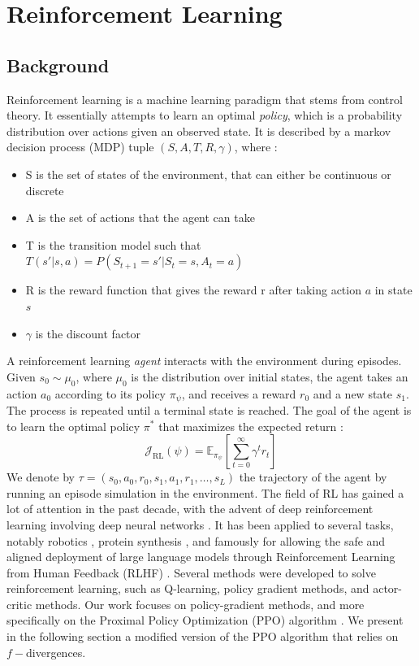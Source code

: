 \section{Reinforcement Learning }\label{sec:rl:sec2}
\subsection{Background}
Reinforcement learning is a machine learning paradigm that stems from control theory. It essentially attempts to learn an optimal \textit{policy}, which is a probability distribution over actions given an observed state.
It is described by a markov decision process (MDP) tuple $(S, A, T, R, \gamma )$, where :
\begin{itemize}
    \item S is the set of states of the environment, that can either be continuous or discrete
    \item A is the set of actions that the agent can take
    \item T is the transition model such that $T(s'| s,a ) = P(S_{t+1} = s' | S_t = s , A_t = a)$
    \item R is the reward function that gives the reward r after taking action $a$ in state $s$
    \item $\gamma$ is the discount factor
\end{itemize}
A reinforcement learning \textit{agent} interacts with the environment during episodes. Given $s_{0} \sim \mu_{0}$, where $\mu_{0}$ is the distribution over initial states, the agent takes an action $a_{0}$ according to its policy $\pi_{\psi}$, and receives a reward $r_{0}$ and a new state $s_{1}$. The process is repeated until a terminal state is reached. The goal of the agent is to learn the optimal policy $\pi^{*}$ that maximizes the expected return :
\begin{equation}
    \mathcal{J}_{\mathrm{RL}}(\psi) = \mathbb{E}_{\pi_{\psi}}[\sum_{t=0}^{\infty} \gamma^{t}r_{t}]
\end{equation}
We denote by $\tau = (s_{0},a_{0},r_{0},s_{1},a_{1},r_{1},\ldots,s_{L})$ the trajectory of the agent by running an episode simulation in the environment.
The field of RL has gained a lot of attention in the past decade, with the advent of deep reinforcement learning involving deep neural networks \citep{mnih2013playingatarideepreinforcement}. It has been applied to several tasks, notably robotics \citep{gupta2019relaypolicylearningsolving}, protein synthesis \citep{jumper2021highly}, and famously for allowing the safe and aligned deployment of large language models through Reinforcement Learning from Human Feedback (RLHF) \citep{ouyang2022traininglanguagemodelsfollow}.
Several methods were developed to solve reinforcement learning, such as Q-learning, policy gradient methods, and actor-critic methods. Our work focuses on policy-gradient methods, and more specifically on the Proximal Policy Optimization (PPO) algorithm \citep{schulman2017proximal}. We present in the following section a modified version of the PPO algorithm that relies on $f-$divergences.
